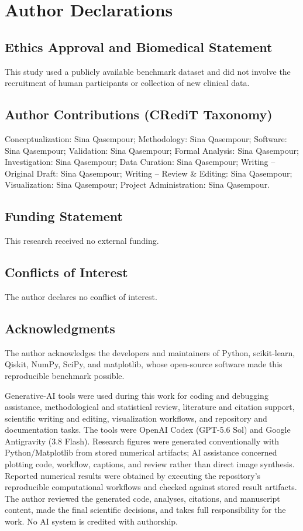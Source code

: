 \documentclass[12pt,a4paper]{article}
\begin{document}
\section*{Author Declarations}
\subsection*{Ethics Approval and Biomedical Statement}
This study used a publicly available benchmark dataset and did not involve the recruitment of human participants or collection of new clinical data.

\subsection*{Author Contributions (CRediT Taxonomy)}
Conceptualization: Sina Qasempour; Methodology: Sina Qasempour; Software: Sina Qasempour; Validation: Sina Qasempour; Formal Analysis: Sina Qasempour; Investigation: Sina Qasempour; Data Curation: Sina Qasempour; Writing -- Original Draft: Sina Qasempour; Writing -- Review \& Editing: Sina Qasempour; Visualization: Sina Qasempour; Project Administration: Sina Qasempour.

\subsection*{Funding Statement}
This research received no external funding.

\subsection*{Conflicts of Interest}
The author declares no conflict of interest.

\subsection*{Acknowledgments}
The author acknowledges the developers and maintainers of Python, scikit-learn, Qiskit, NumPy, SciPy, and matplotlib, whose open-source software made this reproducible benchmark possible.

Generative-AI tools were used during this work for coding and debugging assistance, methodological and statistical review, literature and citation support, scientific writing and editing, visualization workflows, and repository and documentation tasks. The tools were OpenAI Codex (GPT-5.6 Sol) and Google Antigravity (3.8 Flash). Research figures were generated conventionally with Python/Matplotlib from stored numerical artifacts; AI assistance concerned plotting code, workflow, captions, and review rather than direct image synthesis. Reported numerical results were obtained by executing the repository's reproducible computational workflows and checked against stored result artifacts. The author reviewed the generated code, analyses, citations, and manuscript content, made the final scientific decisions, and takes full responsibility for the work. No AI system is credited with authorship.



\end{document}
